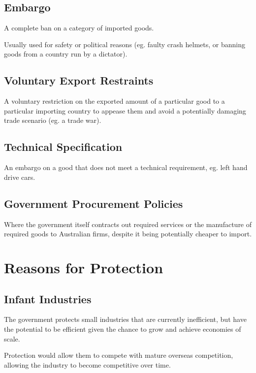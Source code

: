 \documentclass[a4paper,11pt]{article}
\begin{document}
\subsection{Embargo}

A complete ban on a category of imported goods.

Usually used for safety or political reasons (eg. faulty crash helmets, or
banning goods from a country run by a dictator).


\subsection{Voluntary Export Restraints}

A voluntary restriction on the exported amount of a particular good to a
particular importing country to appease them and avoid a potentially damaging
trade scenario (eg. a trade war).


\subsection{Technical Specification}

An embargo on a good that does not meet a technical requirement, eg. left hand
drive cars.


\subsection{Government Procurement Policies}

Where the government itself contracts out required services or the manufacture
of required goods to Australian firms, despite it being potentially cheaper to
import.




\section{Reasons for Protection}

\subsection{Infant Industries}

The government protects small industries that are currently inefficient, but
have the potential to be efficient given the chance to grow and achieve
economies of scale.

Protection would allow them to compete with mature overseas competition,
allowing the industry to become competitive over time.
\end{document}
